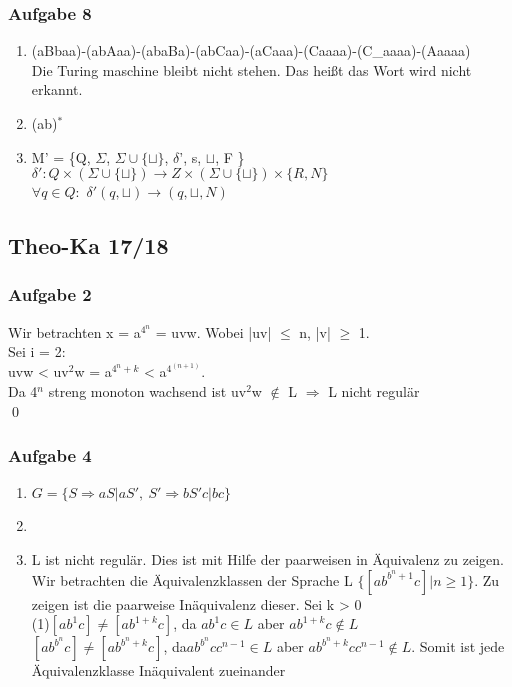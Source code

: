 \documentclass[12pt]{scrartcl}
\begin{document}
\subsubsection{Aufgabe 8}
	\begin{enumerate}
			\item (aBbaa)-(abAaa)-(abaBa)-(abCaa)-(aCaaa)-(Caaaa)-(C\_aaaa)-(Aaaaa) \\
			Die Turing maschine bleibt nicht stehen. Das heißt das Wort wird nicht erkannt.
			\item (ab)$^{*}$
			\item M' = \{Q, $\Sigma$, $\Sigma \cup \{ \sqcup \}$, $\delta$', s, $\sqcup$, F \} \\
			\(\delta': Q \times (\Sigma \cup \{\sqcup\}) \rightarrow Z \times (\Sigma \cup \{\sqcup\}) \times 
			\{R, N \}\) \\
			$\forall q \in Q:$ \(\delta'(q, \sqcup) \rightarrow (q, \sqcup,N)\)
	\end{enumerate}
	
\subsection{Theo-Ka 17/18}
	
\subsubsection{Aufgabe 2}
	Wir betrachten x = a$^{4{^n}}$ = uvw. Wobei |uv| $\le$ n, |v| $\ge$ 1. \\
	Sei i = 2:\\
	uvw < uv$^{2}$w = a$^{4^{n}+k}$ <  a$^{4^{(n+1)}}$. \\
	Da 4$^{n}$ streng monoton wachsend ist uv$^{2}$w $\notin$ L $\Rightarrow$ L nicht regulär \\
	\qed

\subsubsection{Aufgabe 4}
	\begin{enumerate}
		\item \(G = \{ S \Rightarrow aS| aS',\ S' \Rightarrow bS'c|bc\}\)
		\item
		\item L ist nicht regulär. Dies ist mit Hilfe der paarweisen in Äquivalenz zu zeigen.\\
		Wir betrachten die Äquivalenzklassen der Sprache L \(\{ [ab^{b^n+1}c]| n \ge 1 \}\). Zu zeigen ist die paarweise Inäquivalenz dieser. Sei k > 0\\
		(1)\( [ab^{1}c] \neq [ab^{1+k}c]\), da \(ab^{1}c \in L\) aber \(ab^{1+k}c \notin L\) \\
		\( [ab^{b^n}c] \neq [ab^{b^n+k}c]\), da\( ab^{b^n}cc^{n-1} \in L\) aber \( ab^{b^n+k}cc^{n-1} \notin L\). Somit ist jede Äquivalenzklasse Inäquivalent zueinander 
	\end{enumerate}
	
\end{document}
